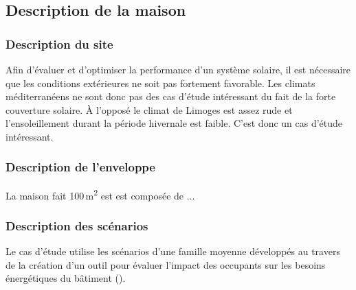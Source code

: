 \subsection{Description de la maison} %
\label{sub:description_de_la_maison}

\subsubsection{Description du site} %
\label{ssub:modelisation_du_site}

Afin d’évaluer et d’optimiser la performance d’un système solaire, il est nécessaire
que les conditions extérieures ne soit pas fortement favorable.
Les climats méditerranéens ne sont donc pas des cas d’étude intéressant du fait
de la forte couverture solaire.
À l’opposé le climat de Limoges est assez rude et l’ensoleillement durant la période
hivernale est faible. C’est donc un cas d’étude intéressant.


\subsubsection{Description de l’enveloppe} %
\label{ssub:description_de_l_enveloppe}

La maison fait 100\,\si{m^{2}} est est composée de ...

\subsubsection{Description des scénarios} %
\label{ssub:description_des_scenarios}

Le cas d’étude utilise les scénarios d’une famille moyenne développés au travers de
la création d’un outil pour évaluer l’impact des occupants sur les besoins
énergétiques du bâtiment (\cite{Vorger2014}).


